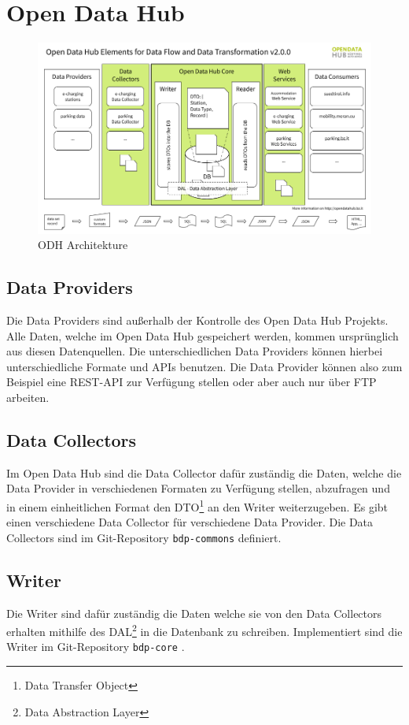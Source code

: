 \documentclass[a4paper,12pt]{article}
\begin{document}
\section{Open Data Hub}
\begin{figure}[H]
    \centering
    \includegraphics[width=\linewidth]{assets/odh-architecture.png}
    \caption{ODH Architekture \cite{web:odhdoc}}
    \label{fig:odharch}
\end{figure}

\subsection{Data Providers}
Die Data Providers sind außerhalb der Kontrolle des Open Data Hub Projekts.
Alle Daten, welche im Open Data Hub gespeichert werden, kommen ursprünglich
aus diesen Datenquellen. Die unterschiedlichen Data Providers können hierbei
unterschiedliche Formate und APIs benutzen. Die Data Provider können also zum
Beispiel eine REST-API zur Verfügung stellen oder aber auch nur über FTP
arbeiten.

\subsection{Data Collectors}
Im Open Data Hub sind die Data Collector dafür zuständig die Daten, welche die
Data Provider in verschiedenen Formaten zu Verfügung stellen, abzufragen und in
einem einheitlichen Format den DTO\footnote{\label{foo:dto}Data Transfer Object} an den Writer
weiterzugeben. Es gibt einen verschiedene Data Collector für verschiedene Data
Provider. Die Data Collectors sind im Git-Repository \texttt{bdp-commons}
\cite{web:bdpcommongit} definiert.

\subsection{Writer}
Die Writer sind dafür zuständig die Daten welche sie von den Data Collectors
erhalten mithilfe des DAL\footnote{\label{foo:dal}Data Abstraction Layer} in die Datenbank zu
schreiben. Implementiert sind die Writer im Git-Repository \texttt{bdp-core}
\cite{web:bdpcoregit}.
\end{document}
